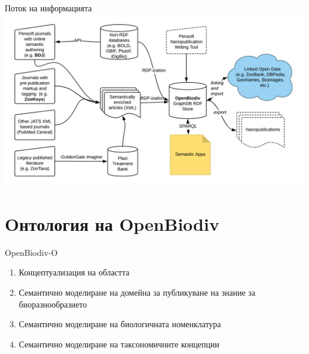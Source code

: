 \documentclass[bulgarian]{beamer}
\begin{document}
\begin{frame}{Поток на информацията}
\centering
\includegraphics[width=\textwidth]{Figures/openbiodiv-sources}
\decoRule

\end{frame}


\section{Oнтология на OpenBiodiv}

\begin{frame}{OpenBiodiv-O}
\begin{enumerate}
    \item Концептуализация на областта
    \item Семантично моделиране на домейна за публикуване на знание за биоразнообразието
    \item Семантично моделиране на биологичната номенклатура
    \item Семантично моделиране на таксономичните концепции
\end{enumerate}
\end{frame}
\end{document}

